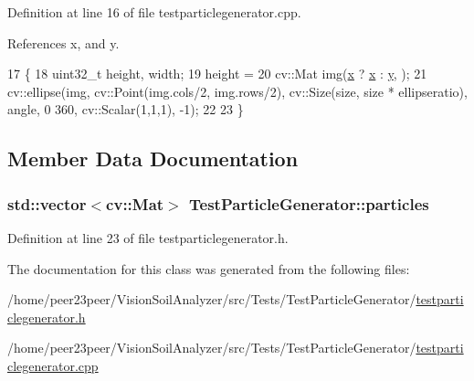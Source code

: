 Definition at line 16 of file testparticlegenerator.\+cpp.



References x, and y.


\begin{DoxyCode}
17 \{
18     uint32\_t height, width;
19     height =
20     cv::Mat img(\hyperlink{_comparision_pictures_2_createtest_image_8m_a9336ebf25087d91c818ee6e9ec29f8c1}{x} ? \hyperlink{_comparision_pictures_2_createtest_image_8m_a9336ebf25087d91c818ee6e9ec29f8c1}{x} : \hyperlink{_comparision_pictures_2_createtest_image_8m_a2fb1c5cf58867b5bbc9a1b145a86f3a0}{y}, );
21     cv::ellipse(img, cv::Point(img.cols/2, img.rows/2), cv::Size(size, size * ellipseratio), angle, 0 360, 
      cv::Scalar(1,1,1), -1);
22 
23 \}
\end{DoxyCode}


\subsection{Member Data Documentation}
\hypertarget{class_test_particle_generator_a1e4b2448d046a953a6033a8a60354aa4}{}
\subsubsection[{particles}]{\setlength{\rightskip}{0pt plus 5cm}std\+::vector$<$cv\+::\+Mat$>$ Test\+Particle\+Generator\+::particles}\label{class_test_particle_generator_a1e4b2448d046a953a6033a8a60354aa4}


Definition at line 23 of file testparticlegenerator.\+h.



The documentation for this class was generated from the following files\+:\begin{DoxyCompactItemize}
\item 
/home/peer23peer/\+Vision\+Soil\+Analyzer/src/\+Tests/\+Test\+Particle\+Generator/\hyperlink{testparticlegenerator_8h}{testparticlegenerator.\+h}\item 
/home/peer23peer/\+Vision\+Soil\+Analyzer/src/\+Tests/\+Test\+Particle\+Generator/\hyperlink{testparticlegenerator_8cpp}{testparticlegenerator.\+cpp}\end{DoxyCompactItemize}
